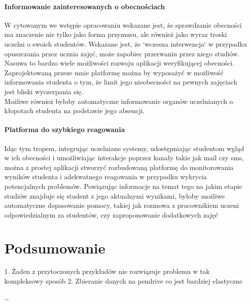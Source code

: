 \documentclass[declaration,shortabstract, mgr]{iithesis}
\begin{document}
\subsubsection{Informowanie zainteresowanych o obecnościach}
\indent W cytowanym we wstępie opracowaniu \cite{theory_base} wskazane jest, że sprawdzanie obecności ma znaczenie nie tylko jako forma przymusu, ale również jako wyraz troski uczelni o swoich studentów. Wskazane jest, że `wczesna interwencja` w przypadku opuszczania przez ucznia zajęć, może zapobiec przerwaniu przez niego studiów. Nasuwa to bardzo wiele możliwości rozwoju aplikacji weryfikującej obecności. Zaprojektowaną przeze mnie platformę można by wyposażyć w możliwość informowania studenta o tym, że limit jego nieobecności na pewnych zajęciach jest bliski wyczerpania się. \\
\indent Możliwe również byłoby automatyczne informowanie organów uczelnianych o kłopotach studenta na podstawie jego absencji. \\
\subsubsection{Platforma do szybkiego reagowania}
\indent Idąc tym tropem, integrując uczelniane systemy, udostępniając studentom wgląd w ich obecności i umożliwiając interakcje poprzez kanały takie jak mail czy sms, można z prostej aplikacji stworzyć rozbudowaną platformę do monitorowania wyników studenta i adekwatnego reagowania w przypadku wykrycia potencjalnych problemów. Powiązując informacje na temat tego na jakim etapie studiów znajduje się student z jego aktualnymi wynikami, byłoby możliwe automatyczne dopasowanie pomocy, takiej jak rozmowa z pracownikiem uczeni odpowiedzialnym za studentów, czy zaproponowanie dodatkowych zajęć

\chapter{Podsumowanie}
1. Żaden z przytoczonych przykładów nie rozwiązuje problemu w tak kompleksowy sposób
2. Zbieranie danych na pendrive co jest bardziej elastyczne

\ldots
\end{document}
